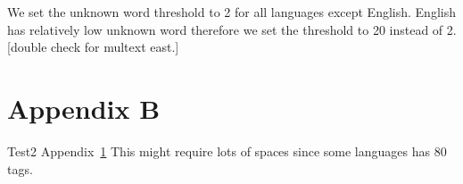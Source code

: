 We set the unknown word threshold to 2 for all languages except
English.  English has relatively low unknown word therefore we set the
threshold to 20 instead of 2.[double check for multext east.]

\section{Appendix B}
\label{app:tags}
Test2 Appendix~\ref{app:tags} This might require lots of spaces since
some languages has 80 tags.
